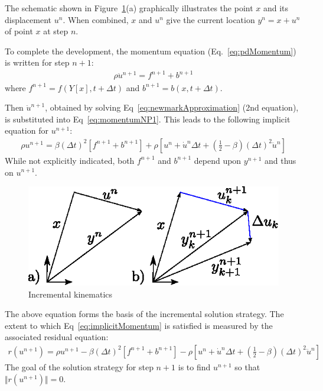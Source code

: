 \documentclass[pdf,ps2pdf,12pt]{SANDreport}
\begin{document}
The schematic shown in Figure~\ref{fig:incrementalConfiguration}(a) graphically illustrates the point $x$ and its displacement $u^n$.  When combined, $x$ and $u^n$ give the current location $y^n=x+u^n$  of point $x$ at step $n$.  

To complete the development, the momentum equation (Eq.~\ref{eq:pdMomentum}) is written for step $n+1$:
\begin{eqnarray}
\rho \ddot{u}^{n+1} = f^{n+1} + b^{n+1} \label{eq:momentumNP1}
\end{eqnarray}
where $ f^{n+1}=f(Y[x],t+\Delta t)$ and  $b^{n+1}=b(x,t+\Delta t)$.

Then $\ddot{u}^{n+1}$, obtained by solving Eq~\ref{eq:newmarkApproximation} (2nd equation),  is substituted into Eq~\ref{eq:momentumNP1}.  This leads to the following implicit equation for $u^{n+1}$:
\begin{eqnarray}
\rho {u}^{n+1} = \beta (\Delta t)^2 \left[f^{n+1} + b^{n+1}\right]+\rho \left[ {u}^{n} + \dot{u}^n \Delta t + (\frac{1}{2}-\beta)(\Delta t)^2 \ddot{u}^{n}\right] \label{eq:implicitMomentum}
\end{eqnarray}
While not explicitly indicated, both $f^{n+1}$ and $b^{n+1}$ depend upon ${y}^{n+1}$ and thus on ${u}^{n+1}$.  

\begin{figure}
\begin{center}
\includegraphics[scale=1.5]{figures/incrementalConfiguration.eps}
\end{center}
\caption{Incremental kinematics}
\label{fig:incrementalConfiguration}
\end{figure}

The above equation forms the basis of the incremental solution strategy.  The extent to which Eq~\ref{eq:implicitMomentum} is satisfied is measured by the associated residual equation:
\begin{eqnarray}
r({u}^{n+1}) = \rho {u}^{n+1}  - \beta (\Delta t)^2 \left[f^{n+1} + b^{n+1}\right]-\rho \left[ {u}^{n} + \dot{u}^n \Delta t + (\frac{1}{2}-\beta)(\Delta t)^2 \ddot{u}^{n}\right] \label{eq:implicitMomentumResidual}
\end{eqnarray}
The goal of the solution strategy for step $n+1$ is to find ${u}^{n+1}$ so that $\Vert r({u}^{n+1}) \Vert=0$.
\end{document}

